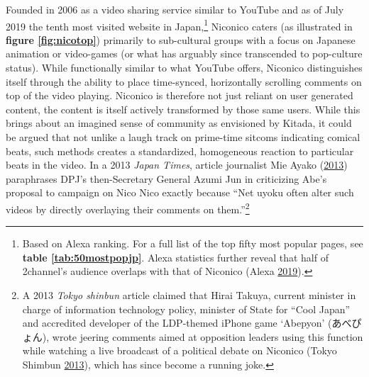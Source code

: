 \documentclass[10pt,british,A4paper,oneside]{memoir}
\begin{document}
Founded in 2006 as a video sharing service similar to YouTube and as of
July 2019 the tenth most visited website in Japan,\footnote{Based on
  Alexa ranking. For a full list of the top fifty most popular pages,
  see \textbf{table \ref{tab:50mostpopjp}}. Alexa statistics further
  reveal that half of 2channel's audience overlaps with that of Niconico
  (Alexa \protect\hyperlink{ref-alexa_alexa_2019}{2019}).} Niconico
caters (as illustrated in \textbf{figure \ref{fig:nicotop}}) primarily
to sub-cultural groups with a focus on Japanese animation or video-games
(or what has arguably since transcended to pop-culture status). While
functionally similar to what YouTube offers, Niconico distinguishes
itself through the ability to place time-synced, horizontally scrolling
comments on top of the video playing. Niconico is therefore not just
reliant on user generated content, the content is itself actively
transformed by those same users. While this brings about an imagined
sense of community as envisioned by Kitada, it could be argued that not
unlike a laugh track on prime-time sitcoms indicating comical beats,
such methods creates a standardized, homogeneous reaction to particular
beats in the video. In a 2013 \emph{Japan Times}, article journalist Mie
Ayako (\protect\hyperlink{ref-mie_xenophobia_2013}{2013}) paraphrases
DPJ's then-Secretary General Azumi Jun in criticizing Abe's proposal to
campaign on Nico Nico exactly because ``Net uyoku often alter such
videos by directly overlaying their comments on them.''\footnote{A 2013
  \emph{Tokyo shinbun} article claimed that Hirai Takuya, current
  minister in charge of information technology policy, minister of State
  for ``Cool Japan'' and accredited developer of the LDP-themed iPhone
  game `Abepyon' (あべぴょん), wrote jeering comments aimed at
  opposition leaders using this function while watching a live broadcast
  of a political debate on Niconico (Tokyo Shimbun
  \protect\hyperlink{ref-tokyo_shimbun_tokyo_2013}{2013}), which has
  since become a running joke.}
\end{document}
